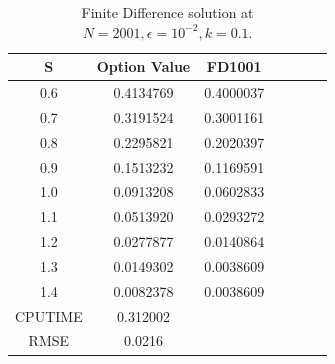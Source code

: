 \documentclass[12pt]{article}
\numberwithin{equation}{subsection} %
\begin{document}

\begin{table}[h]
\centering
  \caption{Finite Difference solution at $N=2001,\epsilon=10^{-2},k=0.1$.}\label{Tab_2}
\vspace{5mm}
\begin{tabular}{|c|c|c|c|c|c|c|}
  \hline
  S &  Option Value& FD1001  \\
  \hline

  0.6 & 0.4134769 &0.4000037 \\
  0.7 &0.3191524&0.3001161 \\
  0.8 &0.2295821& 0.2020397 \\
  0.9 & 0.1513232&0.1169591  \\
  1.0 & 0.0913208&0.0602833 \\
  1.1 & 0.0513920&0.0293272\\
  1.2 & 0.0277877&0.0140864 \\
  1.3 & 0.0149302 &0.0038609 \\
  1.4& 0.0082378&0.0038609 \\
 \hline
CPUTIME&0.312002&\\
\hline
 RMSE&0.0216&\\
  \hline

\end{tabular}
\end{table}
\end{document}
